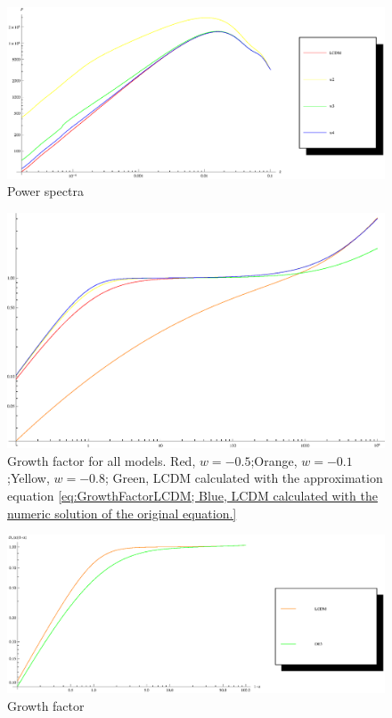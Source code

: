\documentclass{article}
\begin{document}
\begin{figure}[!htbp]
\centering
\includegraphics[width=400pt]{DEs_Sync-PowerSpectra.eps}
\caption{Power spectra}\label{fig:PowerSpectra}
\end{figure}



\begin{figure}
\centering
\includegraphics[width=400pt]{DEs_Sync-GrowthFactor1.eps}
\caption{Growth factor for all models. Red, $w=-0.5$;Orange, $w=-0.1$;Yellow, $w=-0.8$; Green, LCDM calculated with the approximation equation \ref{eq:GrowthFactorLCDM; Blue, LCDM calculated with the numeric solution of the original equation.}}\label{fig:GrowthFactor1}
\end{figure}

\begin{figure}[!htbp]
\centering
\includegraphics[width=400pt]{DEs_Sync-GrowthFactor2.eps}
\caption{Growth factor}\label{fig:GrowthFactor2}
\end{figure}
\end{document}
